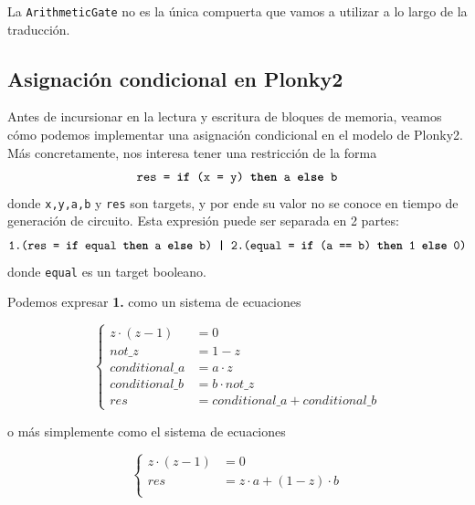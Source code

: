 La \texttt{ArithmeticGate} no es la única compuerta que vamos a utilizar a lo largo de la traducción.

\subsection{Asignación condicional en Plonky2}

Antes de incursionar en la lectura y escritura de bloques de memoria, veamos cómo podemos implementar una asignación condicional en el modelo de Plonky2. Más concretamente, nos interesa tener una restricción de la forma
\[
\texttt{res = \textbf{if} (x = y) \textbf{then} a \textbf{else} b}
\]
donde \texttt{x,y,a,b} y \texttt{res} son targets, y por ende su valor no se conoce en tiempo de generación de circuito. Esta expresión puede ser separada en 2 partes: 
\[
\texttt{1.(res = \textbf{if} equal \textbf{then} a \textbf{else} b) \textbf{|} 2.(equal = \textbf{if} (a == b) \textbf{then} 1 \textbf{else} 0)}
\]
donde \texttt{equal} es un target booleano.

\vspace{1em}

Podemos expresar \textbf{1.} como un sistema de ecuaciones
\begin{figure}[H]
	\centering
	\begin{minipage}[c]{0.6\textwidth}
		\centering
		\[
		\left\{
		\begin{array}{rl}
			z\cdot (z-1) &= 0 \\
			not\_z &= 1 - z \\
			conditional\_a &= a \cdot z \\
			conditional\_b &= b \cdot not\_z \\
			res &= conditional\_a + conditional\_b
		\end{array}
		\right.
		\]
	\end{minipage}
\end{figure}


o más simplemente como el sistema de ecuaciones
\begin{figure}[H]
	\centering
	\begin{minipage}[c]{0.6\textwidth}
		\centering
		\[
		\left\{
		\begin{array}{rl}
			z\cdot (z-1) &= 0 \\
			res &= z \cdot a + (1-z) \cdot b \\
		\end{array}
		\right.
		\]
	\end{minipage}
\end{figure}

